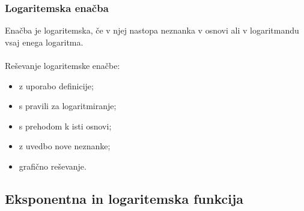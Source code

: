         \begin{frame}[t]
            \frametitle{Logaritemska enačba}

            Enačba je logaritemska, če v njej nastopa neznanka v osnovi ali v logaritmandu vsaj enega logaritma.\\
            ~\\
            Reševanje logaritemske enačbe:
            \begin{itemize}
                \item z uporabo definicije;
                \item s pravili za logaritmiranje;
                \item s prehodom k isti osnovi;
                \item z uvedbo nove neznanke;
                \item grafično reševanje.
            \end{itemize}


        \end{frame}

    \subsection{Eksponentna in logaritemska funkcija}


